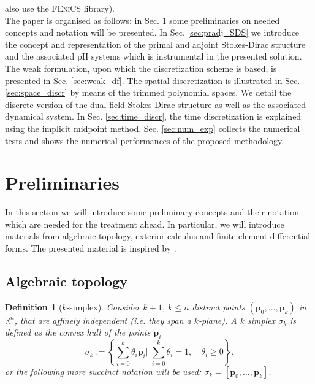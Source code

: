 \documentclass{elsarticle}
\newtheorem{definition}{Definition}
\newcommand{\bbR}{\mathbb{R}}
\newcommand{\fenics}{\textsc{FEniCS}\xspace}
\begin{document}
also use the \fenics \cite{logg2012} library). \\

The paper is organised as follows: in Sec. \ref{sec:prel} some preliminaries on needed concepts and notation will be presented. In Sec. \ref{sec:pradj_SDS} we introduce the concept and representation of the primal and adjoint Stokes-Dirac structure and the associated pH systems which is instrumental in the presented solution. The weak formulation, upon which the discretization scheme is based, is presented in Sec. \ref{sec:weak_df}. The spatial discretization is illustrated in Sec. \ref{sec:space_discr} by means of the trimmed polynomial spaces. We detail the discrete version of the dual field Stokes-Dirac structure as well as the associated dynamical system. In Sec. \ref{sec:time_discr}, the time discretization is explained using the implicit midpoint method. Sec. \ref{sec:num_exp} collects the numerical tests and shows the numerical performances of the proposed methodology. 

\section{Preliminaries}\label{sec:prel}
In this section we will introduce some preliminary concepts and their notation which are needed for the treatment ahead. In particular, we will introduce materials from algebraic topology, exterior calculus and finite element differential forms. The presented material is inspired by \cite{bochev2006,arnold2018finite}.

\subsection{Algebraic topology}



\begin{definition}[$k$-simplex]
Consider $k+1$, $k\le n$ distinct points $(\mathbf{p}_0, \dots, \mathbf{p}_k)$ in $\bbR^n$, that are affinely independent (i.e. they span a $k$-plane). A $k$ simplex $\sigma_k$ is defined as
the convex hull of the points $\mathbf{p}_i$
\begin{equation}
    \sigma_k :=
     \left\{\sum_{i=0}^k \theta_i \mathbf{p}_i \Bigg| \;  \sum_{i=0}^k \theta_i = 1, \quad \theta_i\ge 0 \right\}.
\end{equation}
or the following more succinct notation will be used: $\sigma_k = [\mathbf{p}_0, \dots, \mathbf{p}_k]$.
\end{definition}
\end{document}
